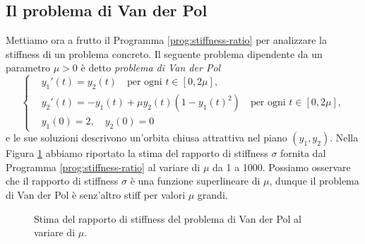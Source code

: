 \subsection*{Il problema di Van der Pol}

Mettiamo ora a frutto il Programma \ref{prog:stiffness-ratio} per analizzare
la stiffness di un problema concreto. Il seguente problema dipendente
da un parametro $\mu > 0$ è detto \emph{problema di Van der Pol}
\[
\left\{
\begin{aligned}
& y_1'(t) =  y_2(t) \quad \text{per ogni $t \in [0,2\mu]$}, \\
& y_2'(t) = -y_1(t) + \mu y_2(t) (1-y_1(t)^2) \quad \text{per ogni $t \in [0,2\mu]$}, \\
& y_1(0)  = 2, \quad y_2(0) = 0
\end{aligned}
\right.
\]
e le sue soluzioni descrivono un'orbita chiusa attrattiva nel piano $(y_1,y_2)$.
Nella Figura \ref{fig:van-der-pol-stiffness} abbiamo riportato la stima del rapporto
di stiffness $\sigma$ fornita dal Programma \ref{prog:stiffness-ratio} al variare
di $\mu$ da 1 a 1000.
Possiamo osservare che il rapporto di stiffness $\sigma$ è una funzione superlineare
di $\mu$, dunque il problema di Van der Pol è senz'altro stiff per valori $\mu$ grandi.





\begin{figure}[p]
\centering
{}
\caption{Stima del rapporto di stiffness del problema di Van der Pol al variare di $\mu$.}
\label{fig:van-der-pol-stiffness}
\end{figure}


